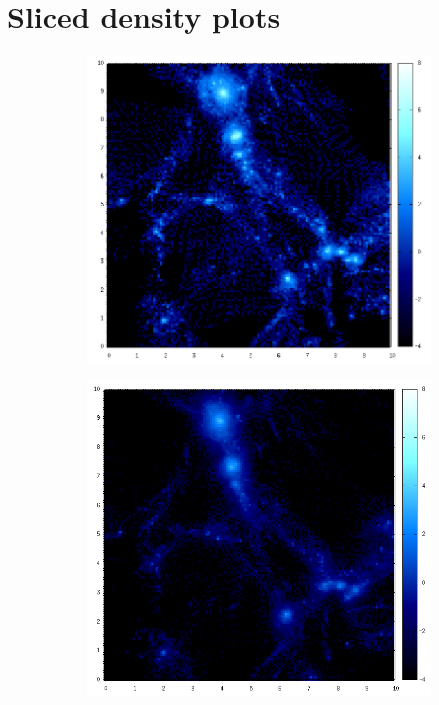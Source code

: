 \documentclass[journal]{IEEEtran}
\begin{document}
\section{Sliced density plots}
\begin{figure}[h!]
	\centering
	\begin{subfigure}[t]{0.25\textwidth}
		\centering
		\includegraphics[width=\linewidth]{DM00-01.png}
	\end{subfigure}
	\quad
	\begin{subfigure}[t]{0.25\textwidth}
		\centering
		\includegraphics[width=\linewidth]{GAS00-01.png}

\end{subfigure}
\end{figure}
\end{document}

